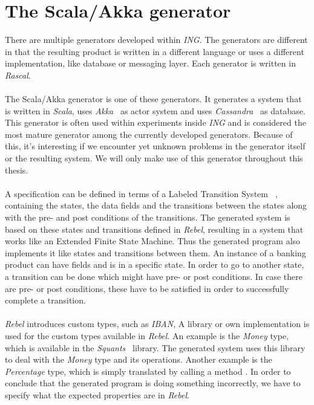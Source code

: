 \section{The Scala/Akka generator}
There are multiple generators developed within \textit{ING}. The generators are
different in that the resulting product is written in a different language or
uses a different implementation, like database or messaging layer. Each
generator is written in \textit{Rascal}.\\
\\
The Scala/Akka generator is one of these generators. It generates a system that is
written in \textit{Scala}, uses \textit{Akka}~\cite{siteAkka2017} as actor
system and uses \textit{Cassandra}~\cite{siteCassandra2016} as database.
This generator is often used within experiments
inside \textit{ING} and is considered the most mature generator among the
currently developed generators. Because of this, it's interesting if we
encounter yet unknown problems in the generator itself or the resulting system.
We will only make use of this generator throughout this thesis.\\
\\
A specification can be defined in terms of a Labeled Transition
System~\cite{stoel2016solving}%
, containing the states, the data fields and the transitions between the states
along with the pre- and post conditions of the transitions. The generated system
is based on these states and transitions defined in \textit{Rebel}, resulting in
a system that works like an Extended Finite State Machine. Thus the generated program
also implements it like states and transitions between them. An instance of a
banking product can have fields and is in a specific state. In order to go to
another state, a transition can be done which might have pre- or post conditions.
In case there are pre- or post conditions, these have to be satisfied in order to
successfully complete a transition.\\
\\
\textit{Rebel} introduces custom types, such as \textit{IBAN},
A library or own implementation is used for the custom types available in \textit{Rebel}. An
example is the \textit{Money} type, which is available in the
\textit{Squants}~\cite{siteSquants2017} library. The generated system uses this
library to deal with the \textit{Money} type and its operations. Another example
is the \textit{Percentage} type, which is simply translated by calling a method
. In order to conclude that the generated program is doing
something incorrectly, we have to specify what the expected properties are in
\textit{Rebel}.


